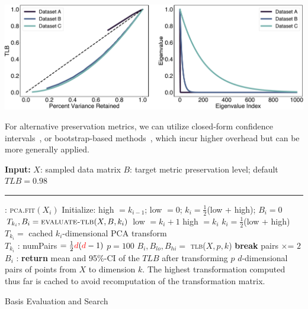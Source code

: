 \vspace{.2cm}
\includegraphics[width= .9\linewidth]{figs/tlb-pca.pdf}

For alternative preservation metrics, we can utilize closed-form confidence intervals~\cite{stats-book,ci1,onlineagg}, or bootstrap-based methods~\cite{bootstrap1,bootstrap2}, which incur higher overhead but can be more generally applied.


\begin{algorithm}
\begin{algorithmic}[1]
\small
\Statex \textbf{Input:}  
\Statex $X$: sampled data matrix
\Statex $B$: target metric preservation level; default $TLB = 0.98$
\Statex  \hrule 
{}: \label{eq:basis}
	\State \textsc{pca.fit}$(X_i)$
	\State Initialize: high $= k_{i-1}$; low $=0$; $k_i= \frac{1}{2}$(low + high); $B_i = 0$
		\State $T_{k_i}, B_i  = \textsc{evaluate-tlb}( X, B, k_i)$
		  low $= k_i + 1$ 
		\Else  \hspace{0pt} high $= k_i $
		\EndIf
		\State $k_i = \frac{1}{2}$(low + high)
	\EndWhile
	\State $T_{k_i} = $ cached $k_i$-dimensional PCA transform\\
	\Return $T_{k_i}$
\EndFunction
\Statex 
{}: \label{eq:eval}
	\State numPairs $= \frac{1}{2}{\color{red}d}({\color{red}d}-1)$
	\State $p = 100$
		\State $B_i, B_{lo}, B_{hi} = $ \textsc{tlb}($ X, p, k$)
			 \label{eq:paircheck}
		   \textbf{break}
		\Else \hspace{0pt} pairs $\times$= $ 2$
		\EndIf
	\EndWhile
	\\\Return $B_i$	
\EndFunction
\Statex 
{}: \label{eq:tlbeval}
	\State \textbf{return } mean and 95\%-CI of the $TLB$ after transforming $p$ $d$-dimensional pairs of points from $X$ to dimension $k$. The highest transformation computed thus far is cached to avoid recomputation of the transformation matrix.
\EndFunction

\end{algorithmic}
\caption{Basis Evaluation and Search}
\label{alg:candidate}
\end{algorithm}


